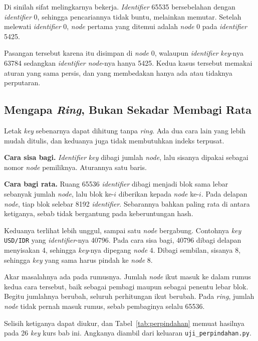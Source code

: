 Di sinilah sifat melingkarnya bekerja. \textit{Identifier} 65535 bersebelahan dengan \textit{identifier} 0,
sehingga pencariannya tidak buntu, melainkan memutar. Setelah melewati \textit{identifier} 0,
\textit{node} pertama yang ditemui adalah \textit{node} 0 pada \textit{identifier} 5425.

Pasangan tersebut karena itu disimpan di \textit{node} 0, walaupun \textit{identifier}
\textit{key}-nya 63784 sedangkan \textit{identifier node}-nya hanya 5425. Kedua kasus
tersebut memakai aturan yang sama persis, dan yang membedakan hanya ada atau
tidaknya perputaran.

\subsection{Mengapa \textit{Ring}, Bukan Sekadar Membagi Rata}

Letak \textit{key} sebenarnya dapat dihitung tanpa \textit{ring}. Ada dua cara lain
yang lebih mudah ditulis, dan keduanya juga tidak membutuhkan indeks terpusat.

\textbf{Cara sisa bagi.} \textit{Identifier} \textit{key} dibagi jumlah \textit{node}, lalu sisanya
dipakai sebagai nomor \textit{node} pemiliknya. Aturannya satu baris.

\textbf{Cara bagi rata.} Ruang 65536 \textit{identifier} dibagi menjadi blok sama lebar
sebanyak jumlah \textit{node}, lalu blok ke-$i$ diberikan kepada \textit{node}
ke-$i$. Pada delapan \textit{node}, tiap blok selebar 8192 \textit{identifier}. Sebarannya
bahkan paling rata di antara ketiganya, sebab tidak bergantung pada keberuntungan
hash.

Keduanya terlihat lebih unggul, sampai satu \textit{node} bergabung. Contohnya
\textit{key} \texttt{USD/IDR} yang \textit{identifier}-nya 40796. Pada cara sisa bagi, 40796 dibagi
delapan menyisakan 4, sehingga \textit{key}-nya dipegang \textit{node} 4. Dibagi
sembilan, sisanya 8, sehingga \textit{key} yang sama harus pindah ke \textit{node} 8.

Akar masalahnya ada pada rumusnya. Jumlah \textit{node} ikut masuk ke dalam
rumus kedua cara tersebut, baik sebagai pembagi maupun sebagai penentu lebar
blok. Begitu jumlahnya berubah, seluruh perhitungan ikut berubah. Pada
\textit{ring}, jumlah \textit{node} tidak pernah masuk rumus, sebab pembaginya
selalu 65536.

Selisih ketiganya dapat diukur, dan Tabel~\ref{tab:perpindahan} memuat hasilnya
pada 26 \textit{key} kurs bab ini. Angkanya diambil dari keluaran
\texttt{uji\_perpindahan.py}.

